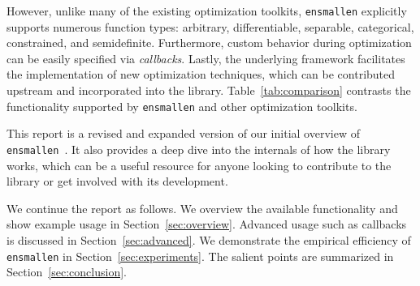 However, unlike many of the existing optimization toolkits,
{\tt ensmallen} explicitly supports numerous function types:
arbitrary, differentiable, separable, categorical, constrained, and semidefinite.
Furthermore, custom behavior during optimization can be easily specified via {\it callbacks}.
Lastly, the underlying framework facilitates the implementation of new optimization techniques,
which can be contributed upstream and incorporated into the library.
Table~\ref{tab:comparison} contrasts the functionality supported
by {\tt ensmallen} and other optimization toolkits.

This report is a revised and expanded version of our initial overview
of {\tt ensmallen}~\cite{ensmallen2018}. 
It also provides a deep dive into the internals
of how the library works, which can be a useful resource for anyone looking
to contribute to the library or get involved with its development.


We continue the report as follows.
We overview the available functionality and show example usage in Section~\ref{sec:overview}.
Advanced usage such as callbacks is discussed in Section~\ref{sec:advanced}.
We demonstrate the empirical efficiency of {\tt ensmallen} in Section~\ref{sec:experiments}.
The salient points are summarized in Section~\ref{sec:conclusion}.


